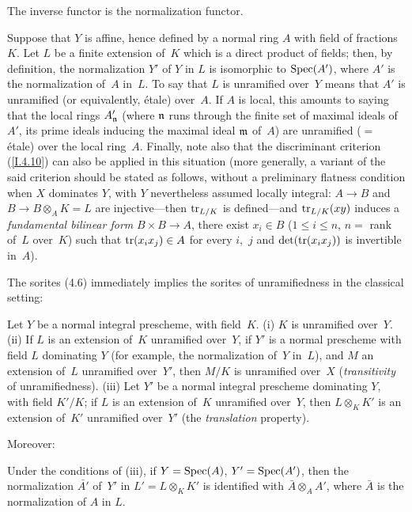 The inverse functor is the normalization functor.

Suppose that $Y$ is affine, hence defined by a normal
ring $A$ with field of fractions~$K$. Let $L$ be a
finite extension of~$K$ which is a direct product of
fields; then, by definition, the normalization $Y'$
of $Y$ in $L$ is isomorphic to $\operatorname{Spec}(A')$, where $A'$
is the normalization of~$A$ in~$L$. To say that $L$
is unramified over~$Y$ means that $A'$ is unramified
(or equivalently, \'etale) over~$A$. If $A$ is local,
this amounts to saying that the local rings
$A^\prime_{\mathfrak{n}}$ (where $\mathfrak{n}$ runs through
the finite set of maximal ideals of~$A'$, \ie its
prime ideals inducing the maximal ideal $\mathfrak{m}$
of~$A$) are unramified ($=$ \'etale) over the local
ring~$A$. Finally, note also that the discriminant
criterion (\ref{I.4.10}) can also be applied in this
situation (more generally, a variant of the said
criterion should be stated as follows, without a
preliminary flatness condition when $X$ dominates
$Y$, with $Y$ nevertheless assumed locally integral:
$A\to B$ and $B\to B\otimes_A K=L$ are injective---then
$\operatorname{tr}_{L/K}$ is defined---and $\operatorname{tr}_{L/K}(xy)$
induces a \emph{fundamental bilinear form}
$B\times B\to A$, \ie there exist $x_i\in B$
($1\le i\le n$, $n=$ rank of~$L$ over~$K$) such that
$\operatorname{tr}(x_ix_j)\in A$ for every $i$,~$j$ and
$\det(\operatorname{tr}(x_ix_j))$ is invertible in~$A$).

The sorites (4.6) immediately implies the sorites
of unramifiedness in the classical setting:

\begin{proposition}
\label{I.10.4}
Let $Y$ be a normal integral prescheme, with field~$K$.
\textup{(i)} $K$ is unramified over~$Y$.
\textup{(ii)} If $L$ is an extension of~$K$ unramified
over~$Y$, if $Y'$ is a normal prescheme with field $L$
dominating $Y$ (for example, the normalization of~$Y$
in~$L$), and $M$ an extension of~$L$ unramified
over~$Y'$, then $M/K$ is unramified over~$X$
(\emph{transitivity} of unramifiedness).
\textup{(iii)} Let $Y'$ be a normal integral prescheme
dominating $Y$, with field $K'/K$; if $L$ is an
extension of~$K$ unramified over~$Y$, then
$L\otimes_K K'$ is an extension of~$K'$ unramified
over~$Y'$ (the \emph{translation} property).
\end{proposition}

Moreover:

\begin{corollary}
\label{I.10.5}
Under the conditions of \textup{(iii)}, if
$Y=\operatorname{Spec}(A)$, $Y'=\operatorname{Spec}(A')$, then the normalization
$\bar{A'}$ of~$Y'$ in $L'=L\otimes_K K'$ is identified
with $\bar{A}\otimes_A A'$, where $\bar{A}$ is the
normalization of $A$ in $L$.
\end{corollary}

